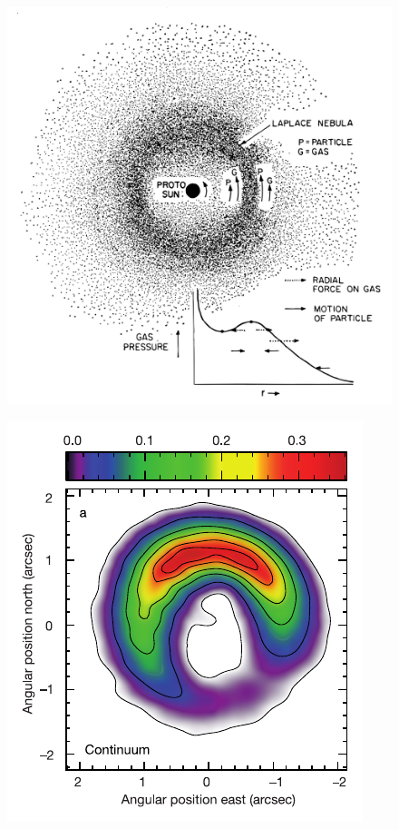 \documentclass[10pt,fleqn,twoside]{article}
\begin{document}
\begin{figure}
\centering
\begin{minipage}[b]{.47\textwidth}
  \centering
  \includegraphics[width=\linewidth]{C1fig/Whipple1972-Fig1_traced}
  \label{fig:whipple}
\end{minipage}%
\hspace{0.05\textwidth}
\begin{minipage}[b]{.47\textwidth}
  \centering
  \includegraphics[width=\linewidth]{C1fig/Casassus2013_fig1a}

\end{minipage}
\end{figure}
\end{document}
